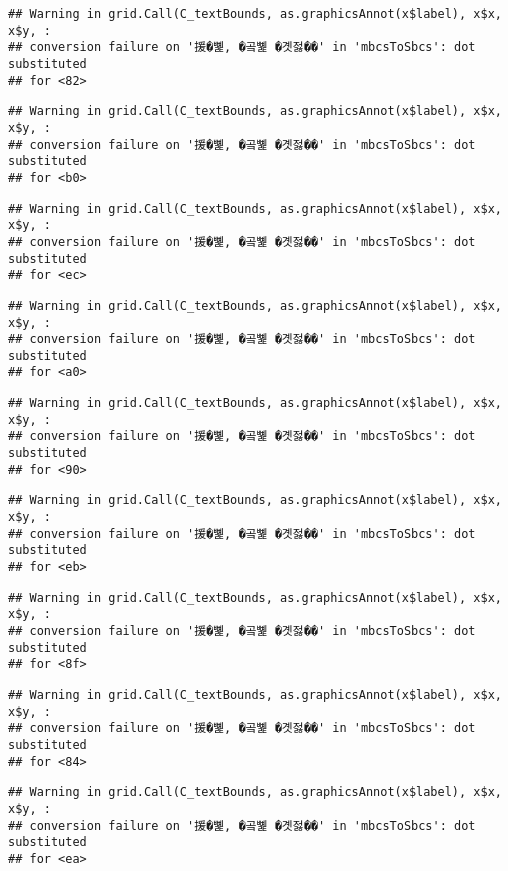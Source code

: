 \documentclass[
]{article}
\begin{document}
\begin{verbatim}
## Warning in grid.Call(C_textBounds, as.graphicsAnnot(x$label), x$x, x$y, :
## conversion failure on '援�뼱, �곸뼱 �곗젏��' in 'mbcsToSbcs': dot substituted
## for <82>
\end{verbatim}

\begin{verbatim}
## Warning in grid.Call(C_textBounds, as.graphicsAnnot(x$label), x$x, x$y, :
## conversion failure on '援�뼱, �곸뼱 �곗젏��' in 'mbcsToSbcs': dot substituted
## for <b0>
\end{verbatim}

\begin{verbatim}
## Warning in grid.Call(C_textBounds, as.graphicsAnnot(x$label), x$x, x$y, :
## conversion failure on '援�뼱, �곸뼱 �곗젏��' in 'mbcsToSbcs': dot substituted
## for <ec>
\end{verbatim}

\begin{verbatim}
## Warning in grid.Call(C_textBounds, as.graphicsAnnot(x$label), x$x, x$y, :
## conversion failure on '援�뼱, �곸뼱 �곗젏��' in 'mbcsToSbcs': dot substituted
## for <a0>
\end{verbatim}

\begin{verbatim}
## Warning in grid.Call(C_textBounds, as.graphicsAnnot(x$label), x$x, x$y, :
## conversion failure on '援�뼱, �곸뼱 �곗젏��' in 'mbcsToSbcs': dot substituted
## for <90>
\end{verbatim}

\begin{verbatim}
## Warning in grid.Call(C_textBounds, as.graphicsAnnot(x$label), x$x, x$y, :
## conversion failure on '援�뼱, �곸뼱 �곗젏��' in 'mbcsToSbcs': dot substituted
## for <eb>
\end{verbatim}

\begin{verbatim}
## Warning in grid.Call(C_textBounds, as.graphicsAnnot(x$label), x$x, x$y, :
## conversion failure on '援�뼱, �곸뼱 �곗젏��' in 'mbcsToSbcs': dot substituted
## for <8f>
\end{verbatim}

\begin{verbatim}
## Warning in grid.Call(C_textBounds, as.graphicsAnnot(x$label), x$x, x$y, :
## conversion failure on '援�뼱, �곸뼱 �곗젏��' in 'mbcsToSbcs': dot substituted
## for <84>
\end{verbatim}

\begin{verbatim}
## Warning in grid.Call(C_textBounds, as.graphicsAnnot(x$label), x$x, x$y, :
## conversion failure on '援�뼱, �곸뼱 �곗젏��' in 'mbcsToSbcs': dot substituted
## for <ea>
\end{verbatim}
\end{document}
